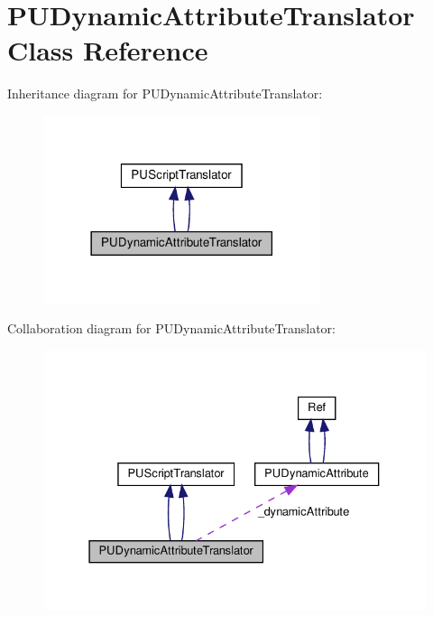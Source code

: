 \hypertarget{classPUDynamicAttributeTranslator}{}\section{P\+U\+Dynamic\+Attribute\+Translator Class Reference}
\label{classPUDynamicAttributeTranslator}


Inheritance diagram for P\+U\+Dynamic\+Attribute\+Translator\+:
\nopagebreak
\begin{figure}[H]
\begin{center}
\leavevmode
\includegraphics[width=230pt]{classPUDynamicAttributeTranslator__inherit__graph}
\end{center}
\end{figure}


Collaboration diagram for P\+U\+Dynamic\+Attribute\+Translator\+:
\nopagebreak
\begin{figure}[H]
\begin{center}
\leavevmode
\includegraphics[width=331pt]{classPUDynamicAttributeTranslator__coll__graph}
\end{center}
\end{figure}
